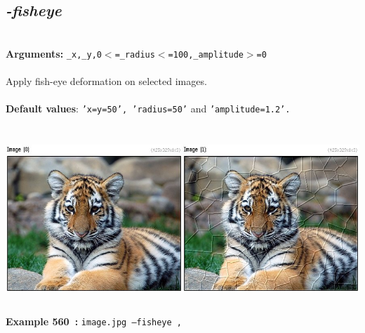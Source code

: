 \documentclass[a4paper,11pt,twoside]{book}
\begin{document}
\subsection{\emph{-fisheye} }\vspace*{-0.5em}
~\\\textbf{Arguments: } 
{\small \texttt{\_x,\_y,0$<$=\_radius$<$=100,\_amplitude$>$=0}}\\~\\
Apply fish-eye deformation on selected images.
~\\~\\\textbf{Default values}: {\small \texttt{'x=y=50', 'radius=50'} and \texttt{'amplitude=1.2'.}}
\begin{center}\includegraphics[keepaspectratio=true,height=7cm,width=\textwidth]{img/gmic_def560.jpg}\\
{\footnotesize \textbf{Example 560~:} \texttt{image.jpg --fisheye ,}}
\end{center}
\end{document}
